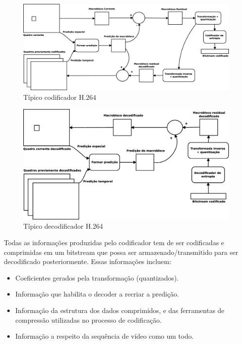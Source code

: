 \begin{figure}[H]
\centering
\includegraphics[scale=0.3]{imagens/fig1.eps}
\caption{Típico codificador H.264}
\label{fig:h264_encoder}
\end{figure}


\begin{figure}[H]
\centering
\includegraphics[scale=0.3]{imagens/fig2.eps}
\caption{Típico decodificador H.264}
\label{fig:h264_decoder}
\end{figure}


Todas as informações produzidas pelo codificador tem de ser codificadas e comprimidas em um bitstream que possa ser armazenado/transmitido para ser decodificado posteriormente. Essas informações incluem:

\begin{itemize}
        \item Coeficientes gerados pela transformação (quantizados).
        \item Informação que habilita o decoder a recriar a predição.
        \item Informação da estrutura dos dados comprimidos, e das ferramentas de compressão utilizadas no processo de codificação.
        \item Informação a respeito da sequência de vídeo como um todo.
\end{itemize}

